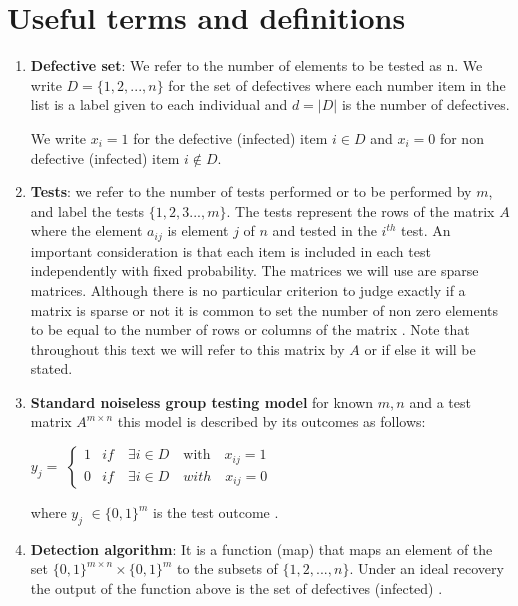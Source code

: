 \section{Useful terms and definitions}
\begin{enumerate}
	\item \textbf{Defective set}: We refer to the number of elements to be tested as n. We write $ D = \{1,2, ..., n\} $ for the set of defectives where each number item in the list is a label given to each individual  and $ d  = |D|$ is the number of defectives.
	
	We write $ x_i  = 1$ for the defective (infected) item   $i\in D $ and $ x_i = 0 $ for non defective (infected) item $ i \notin D $.
	\item \textbf{Tests}: we refer to the number of tests performed or to be performed by $m$, and label the tests $ \{1,2,3 ..., m\} $. The tests represent the rows of the matrix $ A $ where the element $ a_{ij} $ is element $ j $ of $ n $ and tested in the $ i^{th} $ test. An important consideration is that each item is included in each test independently with fixed probability. The matrices we will use are sparse matrices. Although there is no particular criterion to judge exactly if a matrix is sparse or not it is common to set the number of non zero elements to be equal to the number of rows or columns of the matrix \cite{aldridge}. Note that throughout this text we will refer to this matrix by $ A $ or if else it will be stated.   
	\item \textbf{Standard noiseless group testing model} for known $m,n$ and a test matrix $ A^{m\times n} $ this model is described by its outcomes as follows:
	
	\begin{center} $y_{j} =$  
		$\begin{cases}
		1 & if \quad \exists   i \in D  \quad \text{with}  \quad x_{ij} = 1\\
		0 & if \quad \exists   i \in D  \quad with  \quad x_{ij} = 0
		\end{cases}$
	\end{center}
	where $ y_j $ $ \in \{0,1\}^m $ is the test outcome \cite{aldridge}.
	\item \textbf{Detection algorithm}:
	It is a function (map) that maps an element of the set $ \{0,1\}^{m\times n} \times \{0,1\}^m $ to the subsets of $ \{1,2,..., n\} $. Under an ideal recovery the output of the function above is the set of defectives (infected) \cite{aldridge}.  
  


\end{enumerate}
